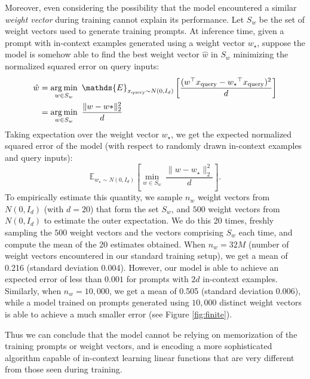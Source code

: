 Moreover, even considering the possibility that the model encountered a similar \emph{weight vector} during training cannot explain its performance.
Let $S_w$ be the set of weight vectors used to generate training prompts. At inference time, given a prompt with in-context examples generated using a weight vector $w_\star$, suppose the model is somehow able to find the best weight vector $\hat{w}$ in $S_w$ minimizing the normalized squared error on query inputs:
\begin{align*}
\hat{w} &= \argmin_{w \in S_w} \ \mathds{E}_{x_{\text{query}} \sim N(0, I_d)} \left[\frac{(w^\top x_{\text{query}} - {w_\star}^\top x_{\text{query}}  )^2}{d} \right] \\
&= \argmin_{w \in S_w} \ \frac{ \lVert w - w* \rVert ^2_2}{d}
\end{align*}
Taking expectation over the weight vector $w_\star$, we get the expected normalized squared error of the model (with respect to randomly drawn in-context examples and query inputs):
\[
\mathds{E}_{{w_\star \sim N(0, I_d)}} \left[ \min_{w \in S_w} \ \frac{ \lVert w - w_\star \rVert ^2_2}{d} \right].
\]
To empirically estimate this quantity, we sample $n_w$ weight vectors from $N(0, I_d)$ (with $d = 20$) that form the set $S_w$, and $500$ weight vectors from $N(0, I_d)$ to estimate the outer expectation. We do this 20 times, freshly sampling the $500$ weight vectors and the vectors comprising $S_w$ each time, and compute the mean of the 20 estimates obtained. 
When $n_w = 32M$ (number of weight vectors encountered in our standard training setup), we get a mean of 0.216 (standard deviation 0.004). However, our model is able to achieve an expected error of less than $0.001$ for prompts with $2d$ in-context examples.
Similarly, when $n_w = 10,000$, we get a mean of 0.505 (standard deviation 0.006), while a model trained on prompts generated using $10,000$ distinct weight vectors is able to achieve a much smaller error (see Figure \ref{fig:finite}). 

Thus we can conclude that the model cannot be relying on memorization
of the training prompts or weight vectors, and is encoding a more sophisticated algorithm capable of in-context
learning linear functions that are very different from those seen during training.
